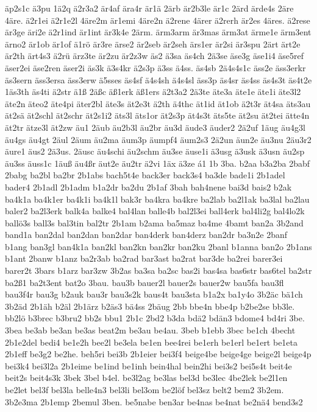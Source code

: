 {äp2s1c
ä3pu
1ä2q
ä2r3a2
är4af
ära4r
är1ä
2ärb
är2b3le
är1c
2ärd
ärde4s
2äre
4äre.
ä2r1ei
ä2r1e2l
4äre2m
är1emi
4äre2n
ä2rene
4ärer
ä2rerh
är2es
4äres.
ä2rese
är3ge
äri2e
ä2r1ind
är1int
är3k4e
2ärm.
ärm3arm
är3mas
ärm3at
ärme1e
ärm3ent
ärno2
är1ob
är1of
ä1rö
är3re
ärse2
är2seb
är2seh
ärs1er
är2si
är3spu
2ärt
ärt2e
är2th
ärt4s3
ä2rü
ärz3te
är2zu
är2z3w
äs2
ä3sa
äs4ch
2ä3se
äse3g
äse1i4
äse5ref
äser2ei
äse2ren
äser2i
äs3k
ä3s4kr
ä2s3p
ä3ss
ä4ss.
äs4sb
2ä4s4s1c
äss2e
äss3erkr
äs3sern
äss3ersa
äss3erw
ä5sses
äs4sf
ä4s4sh
ä4s4sl
äss3p
äs4sr
äs4ss
äs4s3t
äs4t2e
1äs3th
äs4ti
ä2str
ä1ß
2äßc
äß1erk
äß1ers
ä2t3a2
2ä3te
äte3a
äte1e
äte1i
äte3l2
äte2n
äteo2
äte4pi
äter2bl
äte3s
ät2e3t
ä2th
ä4thc
ät1id
ät1ob
ä2t3r
ät4sa
äts3au
ät2sä
ät2schl
ät2schr
ät2s1i2
äts3l
äts1or
ät2s3p
ät4s3t
äts5te
ät2su
ät2tei
ätte4n
ät2tr
ätze3l
ät2zw
äu1
2äub
äu2b3l
äu2br
äu3d
äude3
äuder2
2ä2uf
1äug
äu4g3l
äu4gs
äu4gt
2äul
2äum
äu2ma
äum3p
äumpf4
äum2s3
2ä2un
äun2e
äu3nu
2äu3r2
äure1
äus2
2ä3us.
2äusc
äu4schi
äu2schm
äu3se
äuse1i
ä3usg
ä3usk
ä3usn
äu2sp
äu3ss
äuss1c
1äuß
äu4ßr
äut2e
äu2tr
ä2vi
1äx
ä3ze
á1
1b
3ba.
b2aa
b3a2ba
2babf
2babg
ba2bl
ba2br
2b1abs
bach5t4e
back3er
back3s4
ba3de
bade1i
2b1adel
bader4
2b1adl
2b1adm
b1a2dr
ba2du
2b1af
3bah
bah4nene
bai3d
bais2
b2ak
ba4k1a
ba4k1er
ba4k1i
ba4k1l
bak3r
ba4kra
ba4kre
ba2lab
ba2l1ak
ba3lal
ba2lau
baler2
ba2l3erk
balk4a
balke4
bal4lan
balle4b
bal2l3ei
ball4erk
bal4li2g
bal4lo2k
ballö3s
ball3s
bal3tin
bal2tr
2b1am
b2ama
ba5maz
ba4me
4bamt
ban2a
3b2and
band1a
ban2dal
ban2dan
ban2dar
ban4derk
ban4derz
ban2dr
ba3n2e
2banf
b1ang
ban3gl
ban4k1a
ban2kl
ban2kn
ban2kr
ban2ku
2banl
b1anna
ban2o
2b1ans
b1ant
2banw
b1anz
ba2r3ab
ba2rad
bar3ast
ba2rat
bar3de
ba2rei
barer3ei
barer2t
3bars
b1arz
bar3zw
3b2as
ba3sa
ba2sc
bas2i
bas4sa
bas6str
bas6tel
ba2str
ba2ß1
ba2t3ent
bat2o
3bau.
bau3b
bauer2l
bauer2s
bauer2w
bau5fa
bau3fl
bau3f4r
bau3g
b2auk
bau3r
bau3s2k
baus4t
bau3sta
b1a2x
ba1y4o
3b2äc
bä1ch
3b2äd
2b1äh
b2äl
2b1ärz
b2äs3
bä4ss
2bäug
2bb
bbe4n
bbe4p
b2be2se
bb3le.
bb2lö
b3brec
b3bru2
bb2s
bbu1
2b1c
2bd2
b3da
bdä2
bdän3
bdome4
bd4ri
3be.
3bea
be3ab
be3an
be3as
beat2m
be3au
be4au.
3beb
b1ebb
3bec
be1ch
4becht
2b1e2del
bedi4
be1e2h
bee2l
be3ela
be1en
bee4rei
be1erh
be1erl
be1ert
be1eta
2b1eff
be3g2
be2he.
beh5ri
bei3b
2b1eier
bei3f4
beige4be
beige4ge
beige2l
beige4p
bei3k4
bei3l2a
2b1eime
be1ind
be1inh
bein4hal
bein2hi
bei3s2
bei5s4t
beit4e
beit2s
beit4s3k
3bek
3bel
b4el.
be3l2ag
be3las
bel3d
be3lec
4be2lek
be2l1en
be2let
bel3f
bel3la
belle4n3
bel3li
bel3om
be2löf
bel3sz
belt2
bem2
3b2em.
3b2e3ma
2b1emp
2bemul
3ben.
be5nabe
ben3ar
be4nas
be4nat
be2nä4
bend3s2
}
